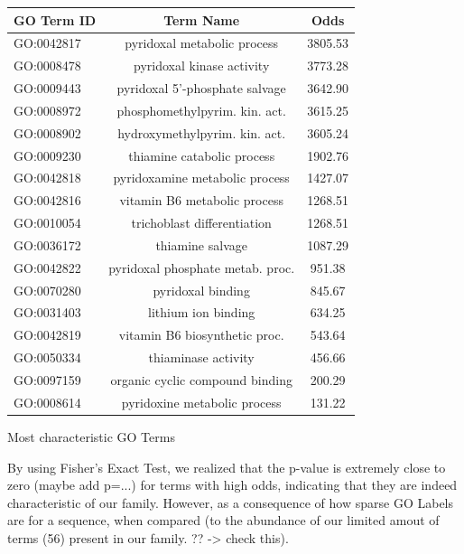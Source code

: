 \documentclass[10pt,twocolumn,letterpaper]{article}
\begin{document}
\begin{center}
    \begin{tabular}{lcc}
        \toprule
        GO Term ID & Term Name & Odds \\
        \midrule
        GO:0042817	& \small{pyridoxal metabolic process} &	3805.53 \\
        GO:0008478	& \small{pyridoxal kinase activity} &	3773.28 \\
        GO:0009443	& \small{pyridoxal 5'-phosphate salvage} &	3642.90 \\
        GO:0008972	& \small{phosphomethylpyrim. kin. act.} &	3615.25 \\
        GO:0008902	& \small{hydroxymethylpyrim. kin. act.} &	3605.24 \\
        GO:0009230	& \small{thiamine catabolic process} &	1902.76 \\
        GO:0042818	& \small{pyridoxamine metabolic process} &	1427.07\\
        GO:0042816	& \small{vitamin B6 metabolic process} &	1268.51\\
        GO:0010054	& \small{trichoblast differentiation} &	1268.51 \\
        GO:0036172	& \small{thiamine salvage} &	1087.29 \\
        GO:0042822	& \small{pyridoxal phosphate metab. proc.} &	951.38 \\
        GO:0070280	& \small{pyridoxal binding} &	845.67 \\
        GO:0031403	& \small{lithium ion binding} &	634.25 \\
        GO:0042819	& \small{vitamin B6 biosynthetic proc.} &	543.64 \\
        GO:0050334	& \small{thiaminase activity} &	456.66 \\
        GO:0097159	& \small{organic cyclic compound binding} &	200.29 \\
        GO:0008614	& \small{pyridoxine metabolic process} &	131.22 \\
        \bottomrule
    \end{tabular}
\end{center} 
\begin{center}
    \small{Most characteristic GO Terms}
\end{center}



By using Fisher's Exact Test, we realized that the p-value is extremely close to zero (maybe add p=...) for terms with high odds, indicating that they are indeed characteristic of our family. However, as a consequence of how sparse GO Labels are for a sequence, when compared (to the abundance of our limited amout of terms (56) present in our family. ?? -> check this).
\end{document}
